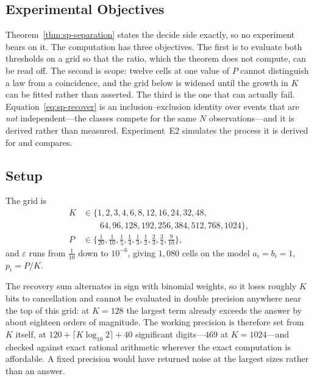 \subsection{Experimental Objectives}

Theorem~\ref{thm:sp-separation} states the decide side exactly, so no experiment bears on it. The
computation has three objectives. The first is to evaluate both thresholds on a grid so that
the ratio, which the theorem does not compute, can be read off. The second is scope: twelve
cells at one value of $P$ cannot distinguish a law from a coincidence, and the grid below is
widened until the growth in $K$ can be fitted rather than asserted. The third is the one that
can actually fail. Equation~\eqref{eq:sp-recover} is an inclusion--exclusion identity over events
that are \emph{not} independent---the classes compete for the same $N$ observations---and it
is derived rather than measured. Experiment~E2 simulates the process it is derived for and
compares.

\subsection{Setup}

The grid is
\begin{align*}
K &\in \{1,2,3,4,6,8,12,16,24,32,48,\\
  &\qquad 64,96,128,192,256,384,512,768,1024\},\\
P &\in \{\tfrac1{20},\tfrac1{10},\tfrac15,\tfrac14,\tfrac13,\tfrac12,\tfrac23,\tfrac34,\tfrac9{10}\},
\end{align*}
and $\varepsilon$ runs from $\tfrac1{10}$ down to $10^{-6}$, giving $1{,}080$ cells on the
model $a_{i}=b_{i}=1$, $p_{i}=P/K$.

The recovery sum alternates in sign with binomial weights, so it loses roughly $K$ bits to
cancellation and cannot be evaluated in double precision anywhere near the top of this grid:
at $K=128$ the largest term already exceeds the answer by about eighteen orders of magnitude.
The working precision is therefore set from $K$ itself, at
$120+\lceil K\log_{10}2\rceil+40$ significant digits---$469$ at $K=1024$---and checked
against exact rational arithmetic wherever the exact computation is affordable. A fixed
precision would have returned noise at the largest sizes rather than an answer.

